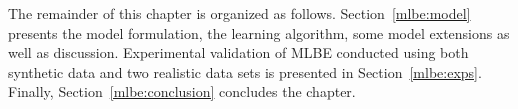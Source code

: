 The remainder of this chapter is organized as follows. Section~\ref{mlbe:model} presents the model formulation, the learning algorithm, some model extensions as well as discussion. Experimental validation of \mbox{MLBE} conducted using both synthetic data and two realistic data sets is presented in Section~\ref{mlbe:exps}. Finally, Section~\ref{mlbe:conclusion} concludes the chapter.











